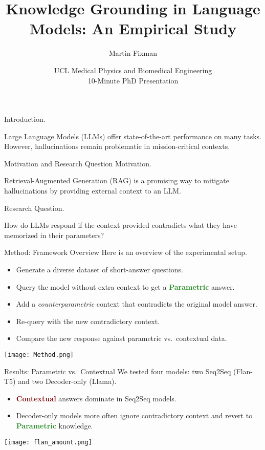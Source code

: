 \documentclass[10pt]{beamer}
\title{Knowledge Grounding in Language Models: An Empirical Study}
\author{Martin Fixman}
\date{UCL Medical Physics and Biomedical Engineering \\[2mm] 10-Minute PhD Presentation}
\newcommand{\Parametric}{\textbf{\textcolor{ForestGreen}{Parametric}}}
\newcommand{\Contextual}{\textbf{\textcolor{Maroon}{Contextual}}}
\begin{document}
\begin{frame}
Introduction.

Large Language Models (LLMs) offer state-of-the-art performance on many tasks.
However, hallucinations remain problematic in mission-critical contexts.

\end{frame}

\begin{frame}{Motivation and Research Question}
Motivation.

Retrieval-Augmented Generation (RAG) is a promising way to mitigate hallucinations by providing external context to an LLM.

Research Question.

How do LLMs respond if the context provided contradicts what they have memorized in their parameters?

\end{frame}

\begin{frame}{Method: Framework Overview}
Here is an overview of the experimental setup.

\begin{itemize}
  \item Generate a diverse dataset of short-answer questions.
  \item Query the model without extra context to get a \Parametric{} answer.
  \item Add a \emph{counterparametric} context that contradicts the original model answer.
  \item Re-query with the new contradictory context.
  \item Compare the new response against parametric vs.\ contextual data.
\end{itemize}

\begin{center}
\texttt{[image: Method.png]}
\end{center}

\end{frame}

\begin{frame}{Results: Parametric vs.\ Contextual}
We tested four models: two Seq2Seq (Flan-T5) and two Decoder-only (Llama).

\begin{itemize}
  \item \Contextual{} answers dominate in Seq2Seq models.
  \item Decoder-only models more often ignore contradictory context and revert to \Parametric{} knowledge.
\end{itemize}

\begin{center}
\texttt{[image: flan\_amount.png]}
\end{center}

\end{frame}
\end{document}
